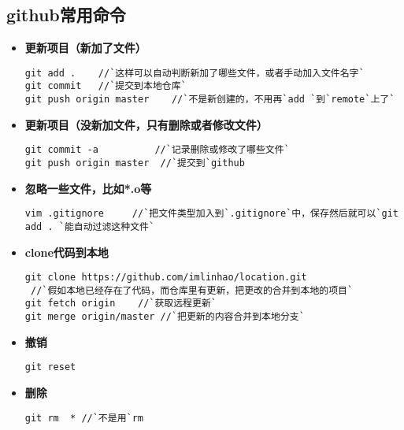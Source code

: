 \subsection{github常用命令}
\begin{itemize}
\item \textbf{更新项目（新加了文件）}
\begin{lstlisting}
git add .    //`这样可以自动判断新加了哪些文件，或者手动加入文件名字`
git commit   //`提交到本地仓库`
git push origin master    //`不是新创建的，不用再`add `到`remote`上了`
\end{lstlisting}

\item \textbf{更新项目（没新加文件，只有删除或者修改文件）}
\begin{lstlisting}
git commit -a          //`记录删除或修改了哪些文件`
git push origin master  //`提交到`github
\end{lstlisting}

\item \textbf{忽略一些文件，比如*.o等}
\begin{lstlisting}
vim .gitignore     //`把文件类型加入到`.gitignore`中，保存然后就可以`git add . `能自动过滤这种文件`
\end{lstlisting}

\item \textbf{clone代码到本地}
\begin{lstlisting}
git clone https://github.com/imlinhao/location.git
 //`假如本地已经存在了代码，而仓库里有更新，把更改的合并到本地的项目`
git fetch origin    //`获取远程更新`
git merge origin/master //`把更新的内容合并到本地分支`
\end{lstlisting}

\item \textbf{撤销}
\begin{lstlisting}
git reset
\end{lstlisting}

\item \textbf{删除}
\begin{lstlisting}
git rm  * //`不是用`rm
\end{lstlisting}
\end{itemize}

